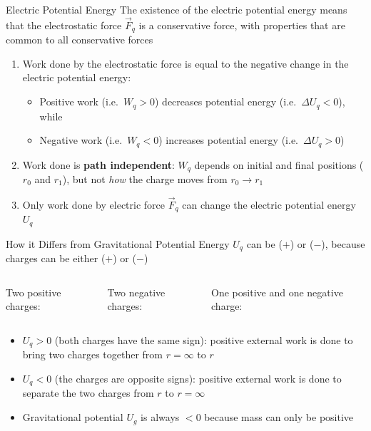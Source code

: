 \documentclass[12pt,aspectratio=169]{beamer}
\begin{document}
\begin{frame}{Electric Potential Energy}
  The existence of the electric potential energy means that the electrostatic
  force $\vec F_q$ is a conservative force, with properties that are common to
  all conservative forces

  \begin{enumerate}
  \item Work done by the electrostatic force is equal to the negative change in
    the electric potential energy:
    
    \begin{itemize}
    \item\vspace{-.1in}Positive work (i.e.\ $W_q>0$)
      decreases potential energy (i.e.\ $\Delta U_q<0$), while
    \item Negative work (i.e.\ $W_q<0$) increases potential
      energy (i.e.\ $\Delta U_q>0$)
    \end{itemize}
  \item Work done is \textbf{path independent}: $W_q$ depends on initial and
    final positions ($r_0$ and $r_1$), but not \emph{how} the charge
    moves from $r_0\rightarrow r_1$
  \item Only work done by electric force $\vec F_q$ can change the electric
    potential energy $U_q$
  \end{enumerate}
\end{frame}



\begin{frame}{How it Differs from Gravitational Potential Energy}
  $U_q$ can be ($+$) or ($-$), because charges can be either ($+$) or ($-$)
 
  \vspace{.2in}
  \begin{columns}
    \centering
    Two positive charges:

    
    \centering
    Two negative charges:

    
    \centering
    One positive and one negative charge:

  \end{columns}
  \begin{itemize}
  \item $U_q>0$ (both charges have the same sign): positive external work is
    done to bring two charges together from $r=\infty$ to $r$
  \item $U_q<0$ (the charges are opposite signs): positive external work is
    done to separate the two charges from $r$ to $r=\infty$
  \item Gravitational potential $U_g$ is always $<0$ because mass can only be
    positive
  \end{itemize}
\end{frame}
\end{document}
